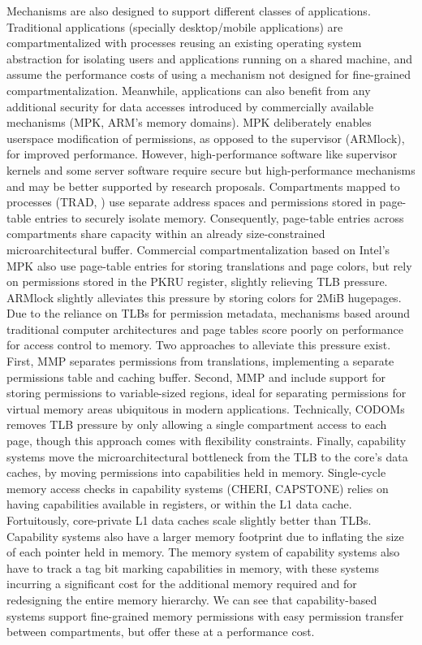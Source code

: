 Mechanisms are also designed to support different classes of applications.
Traditional applications (specially desktop/mobile applications) are 
compartmentalized with processes reusing an existing operating system abstraction
for isolating users and applications running on a shared machine, 
and assume the performance costs of using a mechanism not designed
for fine-grained compartmentalization.
Meanwhile, applications can also benefit from any additional security for
data accesses introduced by commercially available 
mechanisms (MPK, ARM's memory domains).
MPK deliberately enables userspace modification of permissions, as opposed to
the supervisor (ARMlock), for improved performance.
However, high-performance software like supervisor kernels and some server
software require secure but high-performance mechanisms and may be better
supported by research proposals.
Compartments mapped to processes (TRAD, \lwc) use separate address spaces and 
permissions stored in page-table entries to securely isolate memory.
Consequently, page-table entries across compartments share capacity within an 
already size-constrained microarchitectural buffer.
Commercial compartmentalization based on Intel's MPK also use 
page-table entries for storing translations and page colors, 
but rely on permissions stored in the PKRU register, slightly relieving
TLB pressure.
ARMlock slightly alleviates this pressure by storing colors for 2MiB hugepages.
Due to the reliance on TLBs for permission metadata, mechanisms based around
traditional computer architectures and page tables score poorly on performance
for access control to memory.
Two approaches to alleviate this pressure exist.
First, MMP separates permissions from translations, implementing a separate
permissions table and caching buffer.
Second, MMP and \seccells include support for storing permissions to 
variable-sized regions, ideal for separating permissions for virtual memory
areas ubiquitous in modern applications.
Technically, CODOMs removes TLB pressure by only allowing a single compartment
access to each page, though this approach comes with flexibility constraints.
Finally, capability systems move the microarchitectural bottleneck from the
TLB to the core's data caches, by moving permissions into capabilities held
in memory.
Single-cycle memory access checks in capability systems (CHERI, CAPSTONE) relies
on having capabilities available in registers, or within the L1 data cache.
Fortuitously, core-private L1 data caches scale slightly better than TLBs.
Capability systems also have a larger memory footprint due to inflating the
size of each pointer held in memory.
The memory system of capability systems also have to track a tag bit marking
capabilities in memory, with these systems incurring a significant cost for the 
additional memory required and for redesigning the entire memory hierarchy.
We can see that capability-based systems support fine-grained 
memory permissions with easy permission transfer between compartments, but
offer these at a performance cost.

